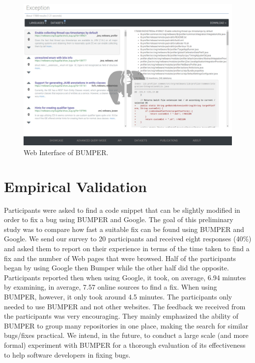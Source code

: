 \documentclass[12pt]{report}
\begin{document}
\begin{figure}[h]
  \centering
    \includegraphics[scale=0.30]{media/bumper-live.png}
    \caption{Web Interface of BUMPER.
    \label{fig:bumper-ui}}
\end{figure}

\section{Empirical Validation}\label{empirical-validation}

Participants were asked to find a code snippet that can be slightly
modified in order to fix a bug using BUMPER and Google. The goal of this
preliminary study was to compare how fast a suitable fix can be found
using BUMPER and Google. We send our survey to 20 participants and
received eight responses (40\%) and asked them to report on their
experience in terms of the time taken to find a fix and the number of
Web pages that were browsed. Half of the participants began by using
Google then Bumper while the other half did the opposite. Participants
reported then when using Google, it took, on average, 6.94 minutes by
examining, in average, 7.57 online sources to find a fix. When using
BUMPER, however, it only took around 4.5 minutes. The participants only
needed to use BUMPER and not other websites. The feedback we received
from the participants was very encouraging. They mainly emphasized the
ability of BUMPER to group many repositories in one place, making the
search for similar bugs/fixes practical. We intend, in the future, to
conduct a large scale (and more formal) experiment with BUMPER for a
thorough evaluation of its effectiveness to help software developers in
fixing bugs.
\end{document}
